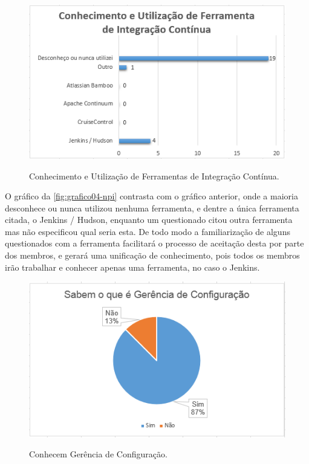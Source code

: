 \begin{figure}[H]
\centering
\caption[Conhecimento e Utilização de Ferramentas de Integração Contínua]{Conhecimento e Utilização de Ferramentas de Integração Contínua.}\includegraphics[scale=0.9]{./images/grafico-ci04}
\label{fig:grafico04-npi}
\end{figure}
O gráfico da \autoref{fig:grafico04-npi} contrasta com o gráfico anterior, onde a maioria desconhece ou nunca utilizou nenhuma ferramenta, e dentre a única ferramenta citada, o Jenkins / Hudson, enquanto um questionado citou outra ferramenta mas não especificou qual seria esta. De todo modo a familiarização de alguns questionados com a ferramenta facilitará o processo de aceitação desta por parte dos membros, e gerará uma unificação de conhecimento, pois todos os membros irão trabalhar e conhecer apenas uma ferramenta, no caso o Jenkins.

 

\begin{figure}[H]
\centering 
\caption[Conhecem Gerência de Configuração]{Conhecem Gerência de Configuração.}\includegraphics[scale=0.9]{./images/grafico-ci05}
\label{fig:grafico05-npi}
\end{figure}

